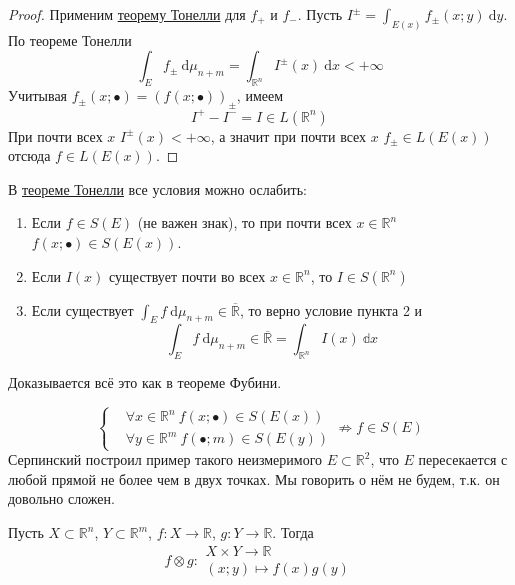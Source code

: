 \documentclass{article}
\begin{document}
    \begin{proof}
        Применим \hyperref[Теорема Тонелли]{теорему Тонелли} для $f_+$ и $f_-$. Пусть $I^\pm=\int_{E(x)}f_\pm(x;y)~\mathrm dy$. По теореме Тонелли
        $$
        \int_E f_\pm~\mathrm d\mu_{n+m}=\int_{\mathbb R^n}I^\pm(x)~\mathrm dx<+\infty
        $$
        Учитывая $f_{\pm}(x;\bullet)=(f(x;\bullet))_\pm$, имеем
        $$
        I^+-I^-=I\in L(\mathbb R^n)
        $$
        При почти всех $x$ $I^\pm(x)<+\infty$, а значит при почти всех $x$ $f_\pm\in L(E(x))$ отсюда $f\in L(E(x))$.
    \end{proof}
    \begin{remark}
        В \hyperref[Теорема Тонелли]{теореме Тонелли} все условия можно ослабить:
        \begin{enumerate}
            \item Если $f\in S(E)$ (не важен знак), то при почти всех $x\in \mathbb R^n$ $f(x;\bullet)\in S(E(x))$.
            \item Если $I(x)$ существует почти во всех $x\in\mathbb R^n$, то $I\in S(\mathbb R^n)$
            \item Если существует $\int_Ef~\mathrm d\mu_{n+m}\in\overline{\mathbb R}$, то верно условие пункта 2 и
            $$
            \int_Ef~\mathrm d\mu_{n+m}\in\overline{\mathbb R}=\int_{\mathbb R^n}I(x)~\mathbb dx
            $$
        \end{enumerate}
        Доказывается всё это как в теореме Фубини.
    \end{remark}
    \begin{remark}
        $$
        \left\{\begin{aligned}
            &\forall x\in\mathbb R^n~f(x;\bullet)\in S(E(x))\\
            &\forall y\in\mathbb R^m~f(\bullet;m)\in S(E(y))
        \end{aligned}\right.\not\Rightarrow f\in S(E)
        $$
        Серпинский построил пример такого неизмеримого $E\subset\mathbb R^2$, что $E$ пересекается с любой прямой не более чем в двух точках. Мы говорить о нём не будем, т.к. он довольно сложен.
    \end{remark}
    \begin{definition}
        Пусть $X\subset\mathbb R^n$, $Y\subset\mathbb R^m$, $f\colon X\to\mathbb R$, $g\colon Y\to\mathbb R$. Тогда
        $$
        f\otimes g\colon\substack{X\times Y\to\mathbb R\\(x;y)\mapsto f(x)g(y)}
        $$
    \end{definition}
\end{document}
